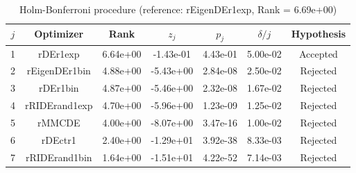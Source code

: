 \begin{table}
\caption{Holm-Bonferroni procedure (reference: rEigenDEr1exp, Rank = 6.69e+00)}\label{holm-test}
\begin{tabular}{c|c|c|c|c|c|c}
\hline\hline
$j$ & Optimizer & Rank & $z_j$ & $p_j$ & $\delta/j$ & Hypothesis\\
\hline
1 & rDEr1exp & 6.64e+00 & -1.43e-01 & 4.43e-01 & 5.00e-02 & Accepted\\
2 & rEigenDEr1bin & 4.88e+00 & -5.43e+00 & 2.84e-08 & 2.50e-02 & Rejected\\
3 & rDEr1bin & 4.87e+00 & -5.46e+00 & 2.32e-08 & 1.67e-02 & Rejected\\
4 & rRIDErand1exp & 4.70e+00 & -5.96e+00 & 1.23e-09 & 1.25e-02 & Rejected\\
5 & rMMCDE & 4.00e+00 & -8.07e+00 & 3.47e-16 & 1.00e-02 & Rejected\\
6 & rDEctr1 & 2.40e+00 & -1.29e+01 & 3.92e-38 & 8.33e-03 & Rejected\\
7 & rRIDErand1bin & 1.64e+00 & -1.51e+01 & 4.22e-52 & 7.14e-03 & Rejected\\
\hline\hline
\end{tabular}
\end{table}
